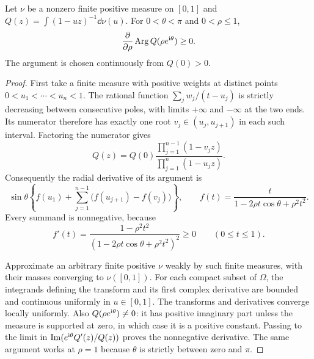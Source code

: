 \begin{lemma}
\label{ado:lem:radialPick}
Let $\nu$ be a nonzero finite positive measure on $[0,1]$ and
$Q(z)=\int(1-uz)^{-1}\dd\nu(u)$. For $0<\theta<\pi$ and
$0<\rho\le1$,
\begin{equation}\label{ado:eq:radialPick}
 \frac{\partial}{\partial\rho}\operatorname{Arg} Q(\rho e^{\mathrm{i}\theta})\ge0.
\end{equation}
The argument is chosen continuously from $Q(0)>0$.
\end{lemma}
\begin{proof}
First take a finite measure with positive weights at distinct points
$0<u_1<\cdots<u_n<1$. The rational function
$\sum_j w_j/(t-u_j)$ is strictly decreasing between consecutive poles,
with limits $+\infty$ and $-\infty$ at the two ends. Its numerator
therefore has exactly one root $v_j\in(u_j,u_{j+1})$ in each such
interval. Factoring the numerator gives
\[
 Q(z)=Q(0)\frac{\prod_{j=1}^{n-1}(1-v_jz)}
                      {\prod_{j=1}^n(1-u_jz)}.
\]
Consequently the radial derivative of its argument is
\[
 \sin\theta\left\{f(u_1)+
          \sum_{j=1}^{n-1}\bigl(f(u_{j+1})-f(v_j)\bigr)\right\},
 \qquad f(t)=\frac{t}{1-2\rho t\cos\theta+\rho^2t^2}.
\]
Every summand is nonnegative, because
\[
 f'(t)=\frac{1-\rho^2t^2}
            {(1-2\rho t\cos\theta+\rho^2t^2)^2}\ge0
 \qquad(0\le t\le1).
\]

Approximate an arbitrary finite positive $\nu$ weakly by such finite
measures, with their masses converging to $\nu([0,1])$. For each
compact subset of $\Omega$, the integrands defining the transform and
its first complex derivative are bounded and continuous uniformly in
$u\in[0,1]$. The transforms and derivatives converge locally uniformly.
Also $Q(\rho e^{\mathrm{i}\theta})\ne0$: it has positive imaginary part
unless the measure is supported at zero, in which case it is a positive
constant. Passing to the limit in
$\operatorname{Im}(e^{\mathrm{i}\theta}Q'(z)/Q(z))$ proves the nonnegative derivative.
The same argument works at $\rho=1$ because $\theta$ is strictly
between zero and $\pi$.
\end{proof}


